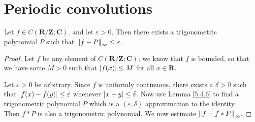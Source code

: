 \section{Periodic convolutions}\label{sec 5.4}

\begin{theorem}\label{5.4.1}
    Let \(f \in C(\mathbf{R} / \mathbf{Z} ; \mathbf{C})\), and let \(\varepsilon > 0\).
    Then there exists a trigonometric polynomial \(P\) such that \(\norm*{f - P}_{\infty} \leq \varepsilon\).
\end{theorem}

\begin{proof}
    Let \(f\) be any element of \(C(\mathbf{R} / \mathbf{Z} ; \mathbf{C})\);
    we know that \(f\) is bounded, so that we have some \(M > 0\) such that \(\abs*{f(x)} \leq M\) for all \(x \in \mathbf{R}\).

    Let \(\varepsilon > 0\) be arbitrary.
    Since \(f\) is uniformly continuous, there exists a \(\delta > 0\) such that \(\abs*{f(x) - f(y)} \leq \varepsilon\) whenever \(\abs*{x - y} \leq \delta\).
    Now use Lemma \ref{5.4.6} to find a trigonometric polynomial \(P\) which is a \((\varepsilon, \delta)\) approximation to the identity.
    Then \(f * P\) is also a trigonometric polynomial.
    We now estimate \(\norm*{f - f * P}_{\infty}\).


\end{proof}
